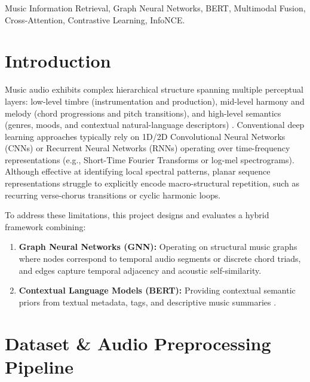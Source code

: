 \documentclass[conference]{IEEEtran}
\begin{document}
\begin{IEEEkeywords}
Music Information Retrieval, Graph Neural Networks, BERT, Multimodal Fusion, Cross-Attention, Contrastive Learning, InfoNCE.
\end{IEEEkeywords}

\section{Introduction}
Music audio exhibits complex hierarchical structure spanning multiple perceptual layers: low-level timbre (instrumentation and production), mid-level harmony and melody (chord progressions and pitch transitions), and high-level semantics (genres, moods, and contextual natural-language descriptors) \cite{fma2017}. Conventional deep learning approaches typically rely on 1D/2D Convolutional Neural Networks (CNNs) or Recurrent Neural Networks (RNNs) operating over time-frequency representations (e.g., Short-Time Fourier Transforms or log-mel spectrograms). Although effective at identifying local spectral patterns, planar sequence representations struggle to explicitly encode macro-structural repetition, such as recurring verse-chorus transitions or cyclic harmonic loops.

To address these limitations, this project designs and evaluates a hybrid framework combining:
\begin{enumerate}
    \item \textbf{Graph Neural Networks (GNN):} Operating on structural music graphs where nodes correspond to temporal audio segments or discrete chord triads, and edges capture temporal adjacency and acoustic self-similarity.
    \item \textbf{Contextual Language Models (BERT):} Providing contextual semantic priors from textual metadata, tags, and descriptive music summaries \cite{musiccaps2023}.
\end{enumerate}

\section{Dataset \& Audio Preprocessing Pipeline}
\end{document}
